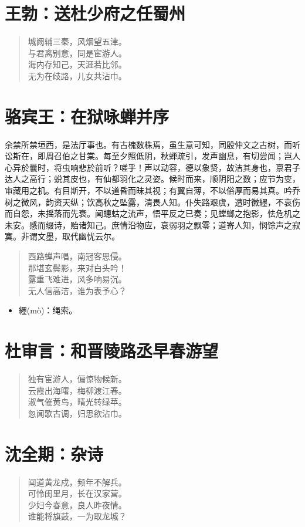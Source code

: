 \documentclass[12pt,oneside]{book}
\newenvironment{shici}{%
\begin{verse}\centering\yanti\large\hspace{12pt}}{\end{verse}}
\begin{document}
\begin{common-format}
\chapter{王勃：送杜少府之任蜀州}
\begin{shici}
城阙辅三秦，风烟望五津。\\
与君离别意，同是宦游人。\\
海内存知己，天涯若比邻。\\
无为在歧路，儿女共沾巾。
\end{shici}

\chapter{骆宾王：在狱咏蝉并序}
余禁所禁垣西，是法厅事也。有古槐数株焉，虽生意可知，同殷仲文之古树，而听讼斯在，即周召伯之甘棠。每至夕照低阴，秋蝉疏引，发声幽息，有切尝闻；岂人心异於曩时，将虫响悲於前听？嗟乎！声以动容，德以象贤，故洁其身也，禀君子达人之高行；蜕其皮也，有仙都羽化之灵姿。候时而来，顺阴阳之数；应节为变，审藏用之机。有目斯开，不以道昏而昧其视；有翼自薄，不以俗厚而易其真。吟乔树之微风，韵资天纵；饮高秋之坠露，清畏人知。仆失路艰虞，遭时徽纆，不哀伤而自怨，未摇落而先衰。闻蟪蛄之流声，悟平反之已奏；见螳螂之抱影，怯危机之未安。感而缀诗，贻诸知己。庶情沿物应，哀弱羽之飘零；道寄人知，悯馀声之寂寞。非谓文墨，取代幽忧云尔。

\begin{shici}
西路蝉声唱，南冠客思侵。\\
那堪玄鬓影，来对白头吟！\\
露重飞难进，风多响易沉。\\
无人信高洁，谁为表予心？
\end{shici}

\begin{itemize}
\item 纆(mò)：绳索。
\end{itemize}

\chapter{杜审言：和晋陵路丞早春游望}
\begin{shici}
独有宦游人，偏惊物候新。\\
云霞出海曙，梅柳渡江春。\\
淑气催黄鸟，晴光转绿苹。\\
忽闻歌古调，归思欲沾巾。
\end{shici}

\chapter{沈全期：杂诗}
\begin{shici}
闻道黄龙戍，频年不解兵。\\
可怜闺里月，长在汉家营。\\
少妇今春意，良人昨夜情。\\
谁能将旗鼓，一为取龙城？
\end{shici}


\end{common-format}
\end{document}
